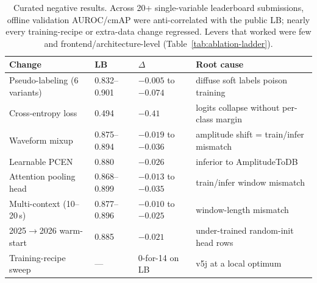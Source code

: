 \begin{table}[t]
  \centering
  \small
  \caption{Curated negative results. Across 20+ single-variable leaderboard submissions, offline
  validation AUROC/cmAP were anti-correlated with the public LB; nearly every training-recipe or
  extra-data change regressed. Levers that worked were few and frontend/architecture-level
  (Table~\ref{tab:ablation-ladder}).}
  \label{tab:curated-negatives}
  \begin{tabular}{@{}llll@{}}
    \toprule
    Change & LB & $\Delta$ & Root cause \\
    \midrule
    Pseudo-labeling (6 variants) & 0.832--0.901 & $-0.005$ to $-0.074$ & diffuse soft labels poison training \\
    Cross-entropy loss           & 0.494        & $-0.41$              & logits collapse without per-class margin \\
    Waveform mixup               & 0.875--0.894 & $-0.019$ to $-0.036$ & amplitude shift = train/infer mismatch \\
    Learnable PCEN               & 0.880        & $-0.026$             & inferior to AmplitudeToDB \\
    Attention pooling head       & 0.868--0.899 & $-0.013$ to $-0.035$ & train/infer window mismatch \\
    Multi-context (10--20\,s)    & 0.877--0.896 & $-0.010$ to $-0.025$ & window-length mismatch \\
    2025$\rightarrow$2026 warm-start & 0.885    & $-0.021$             & under-trained random-init head rows \\
    Training-recipe sweep        & ---          & 0-for-14 on LB       & v5j at a local optimum \\
    \bottomrule
  \end{tabular}
\end{table}
